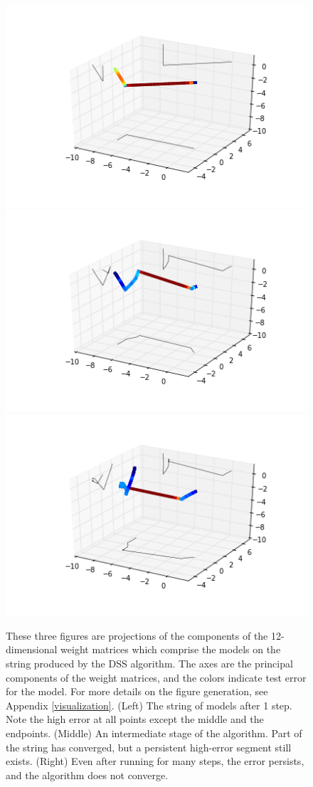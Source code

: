 \begin{figure}
\centering
\includegraphics[width=.4\textwidth]{../Plots/disc1}
\includegraphics[width=.4\textwidth]{../Plots/disc2}
\includegraphics[width=.4\textwidth]{../Plots/disc3}
\caption{These three figures are projections of the components of the 12-dimensional weight matrices which comprise the models on the string produced by the DSS algorithm.  The axes are the principal components of the weight matrices, and the colors indicate test error for the model.  For more details on the figure generation, see Appendix \ref{visualization}. (Left) The string of models after 1 step.  Note the high error at all points except the middle and the endpoints.  (Middle) An intermediate stage of the algorithm.  Part of the string has converged, but a persistent high-error segment still exists.  (Right) Even after running for many steps, the error persists, and the algorithm does not converge.}
\label{discfigs}
\end{figure}